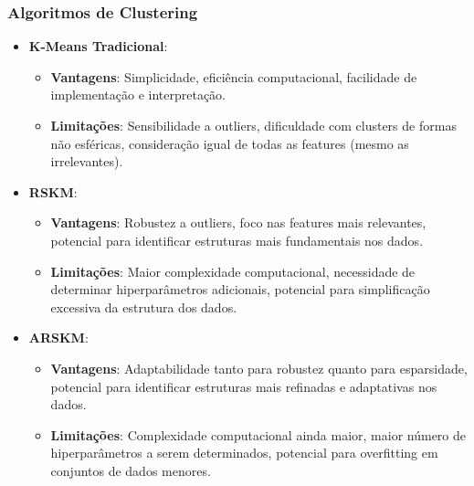 \documentclass[conference]{IEEEtran}
\begin{document}
\subsubsection{Algoritmos de Clustering}
\begin{itemize}
    \item \textbf{K-Means Tradicional}:
        \begin{itemize}
            \item \textbf{Vantagens}: Simplicidade, eficiência computacional, facilidade de implementação e interpretação.
            \item \textbf{Limitações}: Sensibilidade a outliers, dificuldade com clusters de formas não esféricas, consideração igual de todas as features (mesmo as irrelevantes).
        \end{itemize}
    
    \item \textbf{RSKM}:
        \begin{itemize}
            \item \textbf{Vantagens}: Robustez a outliers, foco nas features mais relevantes, potencial para identificar estruturas mais fundamentais nos dados.
            \item \textbf{Limitações}: Maior complexidade computacional, necessidade de determinar hiperparâmetros adicionais, potencial para simplificação excessiva da estrutura dos dados.
        \end{itemize}
    
    \item \textbf{ARSKM}:
        \begin{itemize}
            \item \textbf{Vantagens}: Adaptabilidade tanto para robustez quanto para esparsidade, potencial para identificar estruturas mais refinadas e adaptativas nos dados.
            \item \textbf{Limitações}: Complexidade computacional ainda maior, maior número de hiperparâmetros a serem determinados, potencial para overfitting em conjuntos de dados menores.
        \end{itemize}
\end{itemize}
\end{document}
